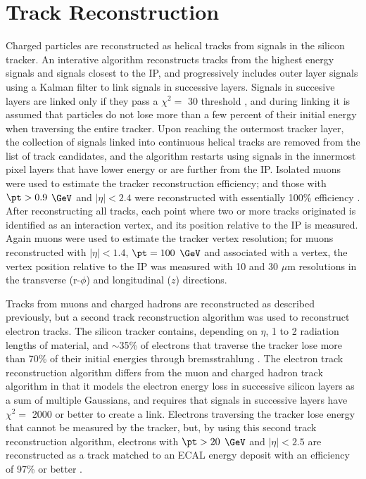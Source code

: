 \section{Track Reconstruction}
\label{sec:trkReco}
Charged particles are reconstructed as helical tracks from signals in the silicon tracker.  An interative algorithm 
reconstructs tracks from the highest energy signals and signals closest to the IP, and progressively includes outer layer 
signals using a Kalman filter to link signals in successive layers.  Signals in succesive layers are linked only if they 
pass a $\chi^{2} =$ 30 threshold \cite{trackerPerformanceInCollisions}, and during linking it is assumed that particles do 
not lose more than a few percent of their initial energy when traversing the entire tracker.  Upon reaching the outermost 
tracker layer, the collection of signals linked into continuous helical tracks are removed from the list of track candidates, 
and the algorithm restarts using signals in the innermost pixel layers that have lower energy or are further from the IP.  Isolated muons 
were used to estimate the tracker reconstruction efficiency; and those with $\pt > 0.9$ $\GeV$ and $|\eta| < 2.4$ 
were reconstructed with essentially 100\% efficiency \cite{trackerPerformanceInCollisions}.  After reconstructing all 
tracks, each point where two or more tracks originated is identified as an interaction vertex, and its position relative 
to the IP is measured.  Again muons were used to estimate the tracker vertex resolution; for muons reconstructed with 
$|\eta| < 1.4$, $\pt = 100$ $\GeV$ and associated with a vertex, the vertex position relative to the IP was measured 
with 10 and 30 $\mu$m resolutions in the transverse (r-$\phi$) and longitudinal ($z$) directions.

Tracks from muons and charged hadrons are reconstructed as described previously, but a second track reconstruction 
algorithm was used to reconstruct electron tracks.  The silicon tracker contains, depending on $\eta$, 1 to 2 radiation 
lengths of material, and $\sim$35\% of electrons that traverse the tracker lose more than 70\% of their initial energies 
through bremsstrahlung \cite{trackerPerformanceInCollisions}.  The electron track reconstruction algorithm differs from 
the muon and charged hadron track algorithm in that it models the electron energy loss in successive silicon layers 
as a sum of multiple Gaussians, and requires that signals in successive layers have $\chi^{2} =$ 2000 or better to create 
a link.  Electrons traversing the tracker lose energy that cannot be measured by the tracker, but, by using this second 
track reconstruction algorithm, electrons with $\pt > 20$ $\GeV$ and $|\eta| < 2.5$ are reconstructed as a track 
matched to an ECAL energy deposit with an efficiency of 97\% or better \cite{gsfPerformanceInCollisions}.


